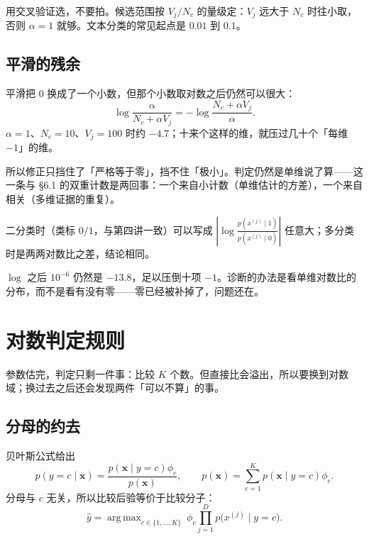 \documentclass[11pt,a4paper,fontset=windows,zihao=-4]{ctexart}
\newcommand{\bx}{\mathbf{x}}
\DeclareMathOperator*{\argmax}{arg\,max}
\begin{document}
\begin{add}
用交叉验证选，不要拍。候选范围按 $V_j/N_c$ 的量级定：$V_j$ 远大于 $N_c$ 时往小取，否则 $\alpha=1$ 就够。文本分类的常见起点是 $0.01$ 到 $0.1$。
\end{add}

\subsection{平滑的残余}

平滑把 $0$ 换成了一个小数，但那个小数取对数之后仍然可以很大：
\[
  \log\frac{\alpha}{N_c+\alpha V_j}
  =-\log\frac{N_c+\alpha V_j}{\alpha}.
\]
$\alpha=1$、$N_c=10$、$V_j=100$ 时约 $-4.7$；十来个这样的维，就压过几十个「每维 $-1$」的维。

所以修正只挡住了「严格等于零」，挡不住「极小」。判定仍然是单维说了算——这一条与 §6.1 的双重计数是两回事：一个来自小计数（单维估计的方差），一个来自相关（多维证据的重复）。

二分类时（类标 $0/1$，与第四讲一致）可以写成 $|\log\frac{p(x^{(j)}\mid1)}{p(x^{(j)}\mid0)}|$ 任意大；多分类时是两两对数比之差，结论相同。

\begin{warn}
$\log$ 之后 $10^{-6}$ 仍然是 $-13.8$，足以压倒十项 $-1$。诊断的办法是看单维对数比的分布，而不是看有没有零——零已经被补掉了，问题还在。
\end{warn}


\section{对数判定规则}

参数估完，判定只剩一件事：比较 $K$ 个数。但直接比会溢出，所以要换到对数域；换过去之后还会发现两件「可以不算」的事。

\subsection{分母的约去}

贝叶斯公式给出
\begin{equation}
  p(y=c\mid\bx)=\frac{p(\bx\mid y=c)\phi_c}{p(\bx)},
  \qquad p(\bx)=\sum_{c=1}^{K}p(\bx\mid y=c)\phi_c .
  \label{eq:post}
\end{equation}
分母与 $c$ 无关，所以比较后验等价于比较分子：
\begin{equation}
  \hat y=\argmax_{c\in\{1,\dots,K\}}\ \phi_c\prod_{j=1}^{D}p\bigl(x^{(j)}\mid y=c\bigr).
  \label{eq:map}
\end{equation}
\end{document}
